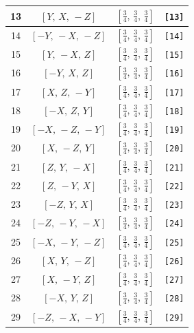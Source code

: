 \documentclass[fleqn,8pt]{jsarticle}
\begin{document}
\begin{longtable}{cccc}
13 & $\left[ Y,\, X,\, - Z \right]$ & $\left[ \frac{3}{4},\, \frac{3}{4},\, \frac{3}{4} \right]$ & {\tt [13]} \\ \hline
14 & $\left[ - Y,\, - X,\, - Z \right]$ & $\left[ \frac{3}{4},\, \frac{3}{4},\, \frac{3}{4} \right]$ & {\tt [14]} \\ \hline
15 & $\left[ Y,\, - X,\, Z \right]$ & $\left[ \frac{3}{4},\, \frac{3}{4},\, \frac{3}{4} \right]$ & {\tt [15]} \\ \hline
16 & $\left[ - Y,\, X,\, Z \right]$ & $\left[ \frac{3}{4},\, \frac{3}{4},\, \frac{3}{4} \right]$ & {\tt [16]} \\ \hline
17 & $\left[ X,\, Z,\, - Y \right]$ & $\left[ \frac{3}{4},\, \frac{3}{4},\, \frac{3}{4} \right]$ & {\tt [17]} \\ \hline
18 & $\left[ - X,\, Z,\, Y \right]$ & $\left[ \frac{3}{4},\, \frac{3}{4},\, \frac{3}{4} \right]$ & {\tt [18]} \\ \hline
19 & $\left[ - X,\, - Z,\, - Y \right]$ & $\left[ \frac{3}{4},\, \frac{3}{4},\, \frac{3}{4} \right]$ & {\tt [19]} \\ \hline
20 & $\left[ X,\, - Z,\, Y \right]$ & $\left[ \frac{3}{4},\, \frac{3}{4},\, \frac{3}{4} \right]$ & {\tt [20]} \\ \hline
21 & $\left[ Z,\, Y,\, - X \right]$ & $\left[ \frac{3}{4},\, \frac{3}{4},\, \frac{3}{4} \right]$ & {\tt [21]} \\ \hline
22 & $\left[ Z,\, - Y,\, X \right]$ & $\left[ \frac{3}{4},\, \frac{3}{4},\, \frac{3}{4} \right]$ & {\tt [22]} \\ \hline
23 & $\left[ - Z,\, Y,\, X \right]$ & $\left[ \frac{3}{4},\, \frac{3}{4},\, \frac{3}{4} \right]$ & {\tt [23]} \\ \hline
24 & $\left[ - Z,\, - Y,\, - X \right]$ & $\left[ \frac{3}{4},\, \frac{3}{4},\, \frac{3}{4} \right]$ & {\tt [24]} \\ \hline
25 & $\left[ - X,\, - Y,\, - Z \right]$ & $\left[ \frac{3}{4},\, \frac{3}{4},\, \frac{3}{4} \right]$ & {\tt [25]} \\ \hline
26 & $\left[ X,\, Y,\, - Z \right]$ & $\left[ \frac{3}{4},\, \frac{3}{4},\, \frac{3}{4} \right]$ & {\tt [26]} \\ \hline
27 & $\left[ X,\, - Y,\, Z \right]$ & $\left[ \frac{3}{4},\, \frac{3}{4},\, \frac{3}{4} \right]$ & {\tt [27]} \\ \hline
28 & $\left[ - X,\, Y,\, Z \right]$ & $\left[ \frac{3}{4},\, \frac{3}{4},\, \frac{3}{4} \right]$ & {\tt [28]} \\ \hline
29 & $\left[ - Z,\, - X,\, - Y \right]$ & $\left[ \frac{3}{4},\, \frac{3}{4},\, \frac{3}{4} \right]$ & {\tt [29]} \\ \hline

\end{longtable}
\end{document}
